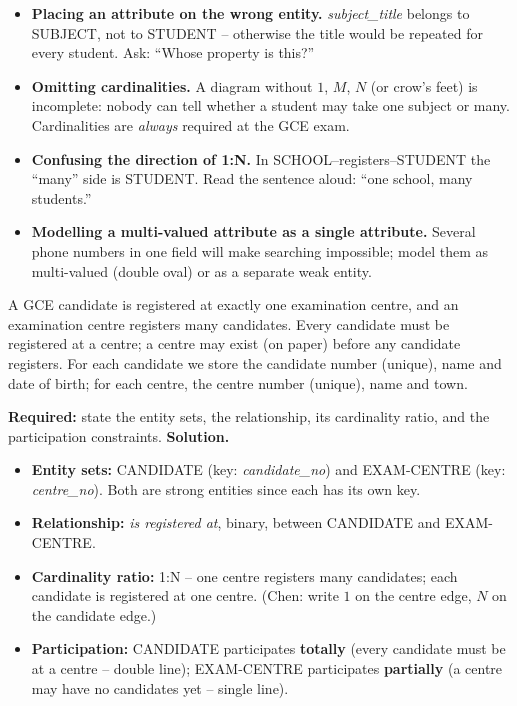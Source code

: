 \documentclass[11pt]{article}
\newcounter{popsec}
\newcounter{popsub}
\newcommand{\courssub}[1]{%
  \stepcounter{popsub}%
  \par\vspace{9pt}\noindent{\popxbold\fontsize{11.5}{13}\selectfont\color{popink}{\color{poporange}\thepopsec.\thepopsub}\hspace{6pt}#1}\par\nopagebreak\vspace{4pt}
}
\begin{document}
\begin{attention}
\begin{itemize}
\item \textbf{Placing an attribute on the wrong entity.} \emph{subject\_title} belongs to SUBJECT, not to STUDENT -- otherwise the title would be repeated for every student. Ask: ``Whose property is this?''
\item \textbf{Omitting cardinalities.} A diagram without $1$, $M$, $N$ (or crow's feet) is incomplete: nobody can tell whether a student may take one subject or many. Cardinalities are \emph{always} required at the GCE exam.
\item \textbf{Confusing the direction of 1:N.} In SCHOOL--registers--STUDENT the ``many'' side is STUDENT. Read the sentence aloud: ``one school, many students.''
\item \textbf{Modelling a multi-valued attribute as a single attribute.} Several phone numbers in one field will make searching impossible; model them as multi-valued (double oval) or as a separate weak entity.
\end{itemize}
\end{attention}

\courssub{Worked Example}

\begin{exoresolu}
A GCE candidate is registered at exactly one examination centre, and an examination centre registers many candidates. Every candidate must be registered at a centre; a centre may exist (on paper) before any candidate registers. For each candidate we store the candidate number (unique), name and date of birth; for each centre, the centre number (unique), name and town.

\textbf{Required:} state the entity sets, the relationship, its cardinality ratio, and the participation constraints.
\tcblower
\textbf{Solution.}
\begin{itemize}
\item \textbf{Entity sets:} CANDIDATE (key: \emph{candidate\_no}) and EXAM-CENTRE (key: \emph{centre\_no}). Both are strong entities since each has its own key.
\item \textbf{Relationship:} \emph{is registered at}, binary, between CANDIDATE and EXAM-CENTRE.
\item \textbf{Cardinality ratio:} 1:N -- one centre registers many candidates; each candidate is registered at one centre. (Chen: write $1$ on the centre edge, $N$ on the candidate edge.)
\item \textbf{Participation:} CANDIDATE participates \textbf{totally} (every candidate must be at a centre -- double line); EXAM-CENTRE participates \textbf{partially} (a centre may have no candidates yet -- single line).
\end{itemize}
\end{exoresolu}
\end{document}
